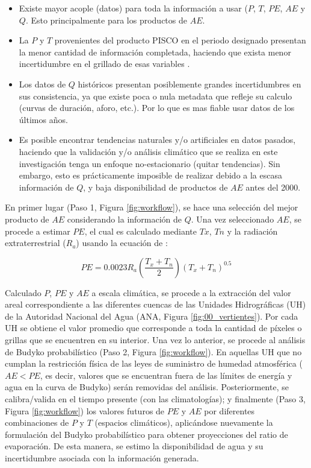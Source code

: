 \documentclass[12pt]{article}
\begin{document}
\begin{itemize}

	\item Existe mayor acople (datos) para toda la información a usar ($P$, $T$, $PE$, $AE$ y $Q$. Esto principalmente para los productos de $AE$.
	
	\item La $P$ y $T$ provenientes del producto PISCO en el periodo designado presentan la menor cantidad de información completada, haciendo que exista menor incertidumbre en el grillado de esas variables \citep{Huerta2019, Aybar2019}.
	
	\item Los datos de $Q$ históricos presentan posiblemente grandes incertidumbres en sus consistencia, ya que existe poca o nula metadata que refleje su calculo (curvas de duración, aforo, etc.). Por lo que es mas fiable usar datos de los últimos años.
	
	\item Es posible encontrar tendencias naturales y/o artificiales en datos pasados, haciendo que la validación y/o análisis climático que se realiza en este investigación tenga un enfoque no-estacionario (quitar tendencias). Sin embargo, esto es prácticamente imposible de realizar debido a la escasa información de $Q$, y baja disponibilidad de productos de $AE$ antes del 2000.
	
\end{itemize}

En primer lugar (Paso 1, Figura \ref{fig:workflow}), se hace una selección del mejor producto de $AE$ considerando la información de $Q$. Una vez seleccionado $AE$, se procede a estimar $PE$, el cual es calculado mediante $Tx$, $Tn$ y la radiación extraterrestrial ($R_{a}$) usando la ecuación de \citet{Hargreaves1985}:

\begin{equation}
PE = 0.0023R_{a}\left ( \frac{T_{x}+T_{n}}{2} \right )\left ( T_{x}+T_{n} \right )^{0.5}
\end{equation}

Calculado $P$, $PE$ y $AE$ a escala climática, se procede a la extracción del valor areal correspondiente a las diferentes cuencas de las Unidades Hidrográficas (UH) de la Autoridad Nacional del Agua (ANA, Figura \ref{fig:00_vertientes}). Por cada UH se obtiene el valor promedio que corresponde a toda la cantidad de píxeles o grillas que se encuentren en su interior. Una vez lo anterior, se procede al análisis de Budyko probabilístico (Paso 2, Figura \ref{fig:workflow}). En aquellas UH que no cumplan la restricción física de las leyes de suministro de humedad atmosférica ($AE < PE$, es decir, valores que se encuentran fuera de las límites de energía y agua en la curva de Budyko) serán removidas del análisis. Posteriormente, se calibra/valida en el tiempo presente (con las climatologías); y finalmente (Paso 3, Figura \ref{fig:workflow}) los valores futuros de $PE$ y $AE$ por diferentes combinaciones de $P$ y $T$ (espacios climáticos), aplicándose nuevamente la formulación del Budyko probabilístico para obtener proyecciones del ratio de evaporación. De esta manera, se estimo la disponibilidad de agua y su incertidumbre asociada con la información generada.
\end{document}
